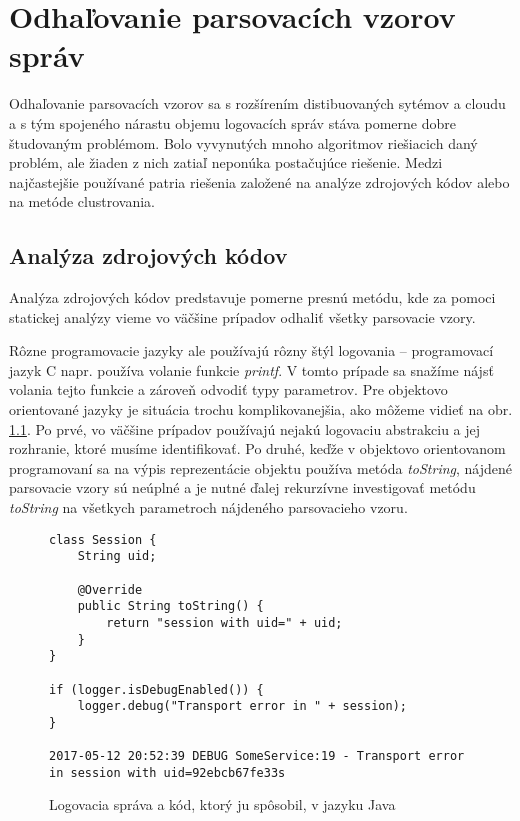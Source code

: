 \chapter{Odhaľovanie parsovacích vzorov správ}

Odhaľovanie parsovacích vzorov sa s rozšírením distibuovaných sytémov a cloudu a s tým spojeného nárastu objemu logovacích správ stáva pomerne dobre študovaným problémom. Bolo vyvynutých mnoho algoritmov riešiacich daný problém, ale žiaden z nich zatiaľ neponúka postačujúce riešenie. Medzi najčastejšie používané patria riešenia založené na analýze zdrojových kódov alebo na metóde clustrovania.

\section{Analýza zdrojových kódov}

Analýza zdrojových kódov predstavuje pomerne presnú metódu, kde za pomoci statickej analýzy vieme vo väčšine prípadov odhaliť všetky parsovacie vzory.
\par Rôzne programovacie jazyky ale používajú rôzny štýl logovania -- programovací jazyk C napr. používa volanie funkcie \emph{printf}.
V tomto prípade sa snažíme nájsť volania tejto funkcie a zároveň odvodiť typy parametrov. Pre objektovo orientované jazyky je situácia trochu komplikovanejšia, ako môžeme vidieť na obr. \ref{fig:static-analysis}. Po prvé, vo väčšine prípadov používajú nejakú logovaciu abstrakciu a jej rozhranie, ktoré musíme identifikovať. Po druhé, keďže v objektovo orientovanom programovaní sa na výpis reprezentácie objektu používa metóda \emph{toString}, nájdené parsovacie vzory sú neúplné a je nutné ďalej rekurzívne investigovať metódu \emph{toString} na všetkych parametroch nájdeného parsovacieho vzoru.

\begin{figure}[htbp]
\centering
\begin{minipage}{0.9\textwidth}
\lstset{tabsize=4,columns=flexible,breaklines=true,breakatwhitespace=true, showstringspaces=false}
\begin{lstlisting}
class Session {
	String uid;
	
	@Override
	public String toString() {
		return "session with uid=" + uid;
	}
}

if (logger.isDebugEnabled()) {
	logger.debug("Transport error in " + session);
}

2017-05-12 20:52:39 DEBUG SomeService:19 - Transport error in session with uid=92ebcb67fe33s
\end{lstlisting} 		
\end{minipage} 
\caption{Logovacia správa a kód, ktorý ju spôsobil, v jazyku Java}
\label{fig:static-analysis}
\end{figure}

